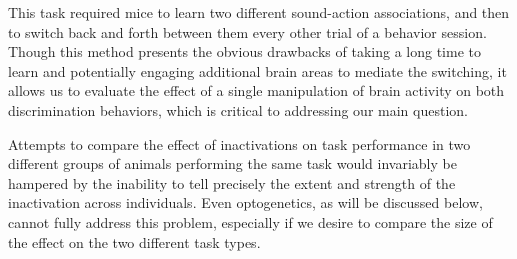 %
This task required mice to learn two different sound-action associations, and
then to switch back and forth between them every other trial of a behavior
session.
%
Though this method presents the obvious drawbacks of taking a long time to
learn and potentially engaging additional brain areas to mediate the switching,
it allows us to evaluate the effect of a single manipulation of brain activity
on both discrimination behaviors, which is critical to addressing our main
question.

Attempts to compare the effect of inactivations on task performance in two
different groups of animals performing the same task would invariably be
hampered by the inability to tell precisely the extent and strength of the
inactivation across individuals.
%
Even optogenetics, as will be discussed below, cannot fully address this
problem, especially if we desire to compare the size of the effect on the two
different task types.




